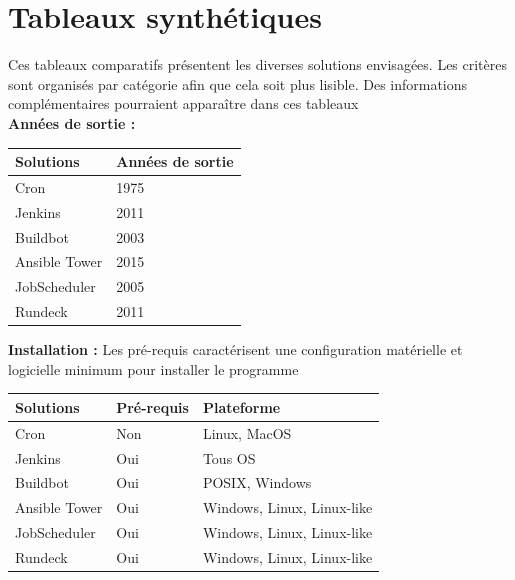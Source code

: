 \documentclass[12pt]{article}
\begin{document}
\newpage
\section{Tableaux synthétiques}
Ces tableaux comparatifs présentent les diverses solutions envisagées. Les critères sont organisés par catégorie afin que cela soit plus lisible. Des informations complémentaires pourraient apparaître dans ces tableaux
\vspace{0.5cm}
\\
\textbf{Années de sortie :}

\vspace{0.5cm}

\begin{center}
\begin{tabular}{|l|l|}
\hline
Solutions     & Années de sortie \\ \hline
Cron          & 1975             \\ \hline
Jenkins       & 2011             \\ \hline
Buildbot      & 2003             \\ \hline
Ansible Tower & 2015             \\ \hline
JobScheduler  & 2005             \\ \hline
Rundeck       & 2011             \\ \hline
\end{tabular}
\end{center}

\vspace{0.5cm}

\textbf{Installation :}
Les pré-requis caractérisent une configuration matérielle et logicielle minimum pour installer le programme
\vspace{0.5cm}
\\
\begin{center}
\begin{tabular}{|l|l|l|}
\hline
Solutions     & Pré-requis & Plateforme                 \\ \hline
Cron          & Non        & Linux, MacOS               \\ \hline
Jenkins       & Oui        & Tous OS                    \\ \hline
Buildbot      & Oui        & POSIX, Windows             \\ \hline
Ansible Tower & Oui        & Windows, Linux, Linux-like \\ \hline
JobScheduler  & Oui        & Windows, Linux, Linux-like \\ \hline
Rundeck       & Oui        & Windows, Linux, Linux-like \\ \hline
\end{tabular}
\end{center}
\end{document}
